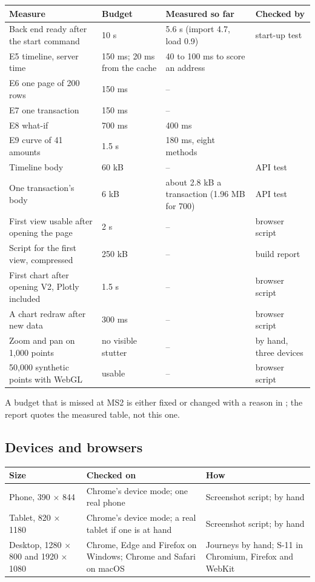 {\small
\begin{longtable}{@{}L{5.6cm}L{2.9cm}L{3.5cm}L{2.1cm}@{}}
\toprule
\textbf{Measure} & \textbf{Budget} & \textbf{Measured so far} & \textbf{Checked by} \\
\midrule
\endhead
Back end ready after the start command & 10 s & 5.6 s (import 4.7, load 0.9) & start-up test \\
E5 timeline, server time & 150 ms; 20 ms from the cache & 40 to 100 ms to score an address &  \\
E6 one page of 200 rows & 150 ms & -- &  \\
E7 one transaction & 150 ms & -- &  \\
E8 what-if & 700 ms & 400 ms &  \\
E9 curve of 41 amounts & 1.5 s & 180 ms, eight methods &  \\
Timeline body & 60 kB\est{} & -- & API test \\
One transaction's body & 6 kB\est{} & about 2.8 kB a transaction (1.96 MB for 700) & API test \\
First view usable after opening the page & 2 s & -- & browser script \\
Script for the first view, compressed & 250 kB\est{} & -- & build report \\
First chart after opening V2, Plotly included & 1.5 s & -- & browser script \\
A chart redraw after new data & 300 ms & -- & browser script \\
Zoom and pan on 1,000 points & no visible stutter & -- & by hand, three devices \\
50,000 synthetic points with WebGL & usable & -- & browser script \\
\bottomrule
\end{longtable}
}

A budget that is missed at MS2 is either fixed or changed with a reason in ; the
report quotes the measured table, not this one.

\subsection{Devices and browsers}
\label{sec:devices}

\begin{center}
\small
\begin{tabularx}{\textwidth}{@{}L{3.2cm}Y L{3.6cm}@{}}
\toprule
\textbf{Size} & \textbf{Checked on} & \textbf{How} \\
\midrule
Phone, 390 × 844 & Chrome's device mode; one real phone & Screenshot script; by hand \\
Tablet, 820 × 1180 & Chrome's device mode; a real tablet if one is at hand & Screenshot script; by hand \\
Desktop, 1280 × 800 and 1920 × 1080 & Chrome, Edge and Firefox on Windows; Chrome and Safari on macOS & Journeys by hand; S-11 in Chromium, Firefox and WebKit \\
\bottomrule
\end{tabularx}
\end{center}

